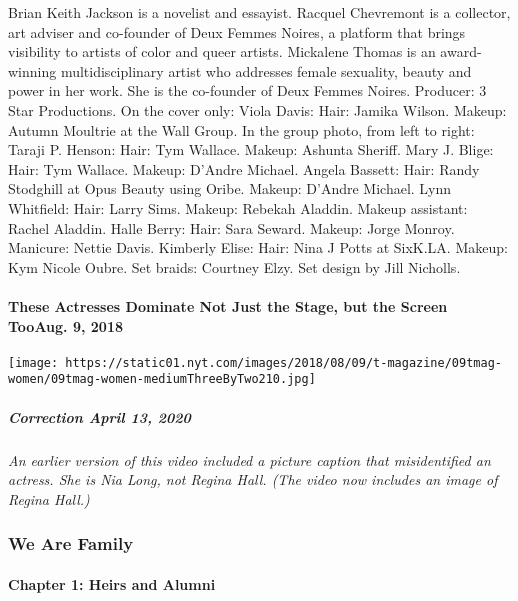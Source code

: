 Brian Keith Jackson is a novelist and essayist. Racquel Chevremont is a
collector, art adviser and co-founder of Deux Femmes Noires, a platform
that brings visibility to artists of color and queer artists. Mickalene
Thomas is an award-winning multidisciplinary artist who addresses female
sexuality, beauty and power in her work. She is the co-founder of Deux
Femmes Noires. Producer: 3 Star Productions. On the cover only: Viola
Davis: Hair: Jamika Wilson. Makeup: Autumn Moultrie at the Wall Group.
In the group photo, from left to right: Taraji P. Henson: Hair: Tym
Wallace. Makeup: Ashunta Sheriff. Mary J. Blige: Hair: Tym Wallace.
Makeup: D'Andre Michael. Angela Bassett: Hair: Randy Stodghill at Opus
Beauty using Oribe. Makeup: D'Andre Michael. Lynn Whitfield: Hair: Larry
Sims. Makeup: Rebekah Aladdin. Makeup assistant: Rachel Aladdin. Halle
Berry: Hair: Sara Seward. Makeup: Jorge Monroy. Manicure: Nettie Davis.
Kimberly Elise: Hair: Nina J Potts at SixK.LA. Makeup: Kym Nicole Oubre.
Set braids: Courtney Elzy. Set design by Jill Nicholls.

\href{https://www.nytimes.com/2018/08/09/t-magazine/allison-janney-idina-menzel-female-actresses.html}{}

\hypertarget{these-actresses-dominate-not-just-the-stage-but-the-screen-tooaug-9-2018}{%
\paragraph{These Actresses Dominate Not Just the Stage, but the Screen
TooAug. 9,
2018}\label{these-actresses-dominate-not-just-the-stage-but-the-screen-tooaug-9-2018}}

\texttt{[image: https://static01.nyt.com/images/2018/08/09/t-magazine/09tmag-women/09tmag-women-mediumThreeByTwo210.jpg]}

\hypertarget{correction-april-13-2020}{%
\subparagraph{\texorpdfstring{\textbf{Correction} April 13,
2020}{Correction April 13, 2020}}\label{correction-april-13-2020}}

\emph{An earlier version of this video included a picture caption that
misidentified an actress. She is Nia Long, not Regina Hall. (The video
now includes an image of Regina Hall.)}

\hypertarget{we-are-family-1}{%
\subsubsection{We Are Family}\label{we-are-family-1}}

\hypertarget{chapter-1-heirs-and-alumni}{%
\paragraph{Chapter 1: Heirs and
Alumni}\label{chapter-1-heirs-and-alumni}}

